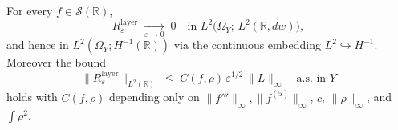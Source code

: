 \documentclass[EJP]{ejpecp}
\newcommand{\R}{\mathbb{R}}
\begin{document}
\begin{lemma}\label{lem:bdy-layer-vanish}
For every $f\in\mathscr S(\R)$,
\[
 R_{\varepsilon}^{\mathrm{layer}}\;\xrightarrow[\varepsilon\to 0]{}\;0
 \quad\text{in }L^{2}\bigl(\Omega_{Y};\,L^{2}(\R,dw)\bigr),
\]
and hence in $L^{2}(\Omega_{Y};H^{-1}(\R))$ via the continuous
embedding $L^{2}\hookrightarrow H^{-1}$. Moreover the bound
\begin{equation}\label{eq:R-layer-bound}
 \|R_{\varepsilon}^{\mathrm{layer}}\|_{L^{2}(\R)}
 \;\le\;C(f,\rho)\,\varepsilon^{1/2}\,\|L\|_{\infty}
 \quad\text{a.s.\ in }Y
\end{equation}
holds with $C(f,\rho)$ depending only on
$\|f'''\|_{\infty},\|f^{(5)}\|_{\infty}$, $c$, $\|\rho\|_{\infty}$,
and $\int\rho^{2}$.
\end{lemma}
\end{document}
